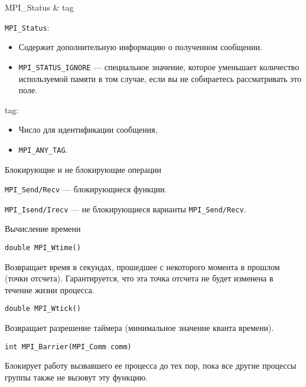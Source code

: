 \begin{frame}{MPI_Status \& tag}

\texttt{MPI_Status}:

\begin{itemize}
    \item Содержит дополнительную информацию о полученном сообщении.
    \item \texttt{MPI_STATUS_IGNORE} --- специальное значение, которое уменьшает количество используемой памяти в том случае, если вы не собираетесь рассматривать это поле.
\end{itemize}

\vfill

tag:

\begin{itemize}
    \item Число для идентификации сообщения,
    \item \texttt{MPI_ANY_TAG}.
\end{itemize}

\end{frame}

\begin{frame}{Блокирующие и не блокирующие операции}

\texttt{MPI_Send/Recv} --- блокирующиеся функции.

\begin{figure}
\centering
{}
\end{figure}

\texttt{MPI_Isend/Irecv} --- не блокирующиеся варианты \texttt{MPI_Send/Recv}.

\end{frame}

\begin{frame}[fragile]{Вычисление времени}

\begin{lstlisting}
double MPI_Wtime()
\end{lstlisting}

Возвращает время в секундах, прошедшее с  некоторого момента в прошлом (точки отсчета). Гарантируется, что эта точка отсчета не будет изменена в течение жизни процесса.

\begin{lstlisting}
double MPI_Wtick()
\end{lstlisting}

Возвращает разрешение таймера (минимальное значение кванта времени).

\begin{lstlisting}
int MPI_Barrier(MPI_Comm comm)
\end{lstlisting}

Блокирует работу вызвавшего ее процесса до тех пор, пока все другие процессы группы также не вызовут эту функцию.

\end{frame}

